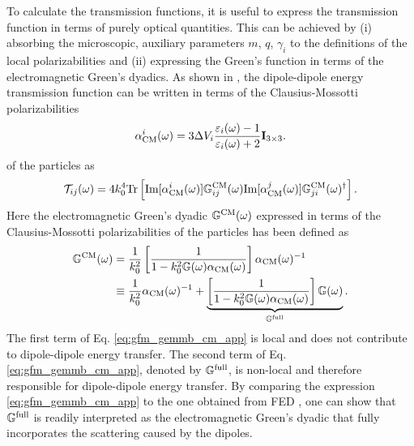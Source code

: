 To calculate the transmission functions, it is useful to express the transmission function in terms of purely optical quantities. This can be achieved by (i) absorbing the microscopic, auxiliary parameters $m$, $q$, $\gamma_i$ to the definitions of the local polarizabilities and (ii) expressing the Green's function in terms of the electromagnetic Green's dyadics. As shown in , the dipole-dipole energy transmission function can be written in terms of the Clausius-Mossotti polarizabilities
\begin{equation}
\alpha_{\textrm{CM}}^i(\omega) = 3\Delta V_i \frac{\varepsilon_i(\omega)-1}{\varepsilon_i(\omega)+2} \mathbf{I}_{3 \times 3}. \label{eq:gfm_alphacm_epsilon}
\end{equation}
of the particles as
\begin{equation}
   \mathcal{T}_{ij}(\omega) = 4 k_0^4 \textrm{Tr} \left[ \textrm{Im}[\alpha^i_{\textrm{CM}}(\omega)] {\mathbb{G}}^{\textrm{CM}}_{ij}(\omega) \textrm{Im}[\alpha^j_{\textrm{CM}}(\omega)] {\mathbb{G}}^{\textrm{CM}}_{ji}(\omega)^{\dagger}\right]. \label{eq:tij_final}
\end{equation}
Here the electromagnetic Green's dyadic ${\mathbb{G}}^{\textrm{CM}}(\omega)$ expressed in terms of the Clausius-Mossotti polarizabilities of the particles has been defined as 
\begin{alignat}{2}
 {\mathbb{G}}^{\textrm{CM}}(\omega) &= \frac{1}{k_0^2} \left[\frac{1}{1-k_0^2 \mathbb{G}(\omega)\alpha_{\textrm{CM}}(\omega)}\right] \alpha_{\textrm{CM}}(\omega)^{-1} \\
  &\equiv \frac{1}{k_0^2} \alpha_{\textrm{CM}}(\omega)^{-1} + \underbrace{ \left[\frac{1}{1-k_0^2 \mathbb{G}(\omega)\alpha_{\textrm{CM}}(\omega)} \right] \mathbb{G}(\omega)}_{{\mathbb{G}}^{\textrm{full}}}. \label{eq:gfm_gemmb_cm_app}
\end{alignat}
The first term of Eq. \eqref{eq:gfm_gemmb_cm_app} is local and does not contribute to dipole-dipole energy transfer. The second term of Eq. \eqref{eq:gfm_gemmb_cm_app}, denoted by ${\mathbb{G}}^{\textrm{full}}$, is non-local and therefore responsible for dipole-dipole energy transfer. By comparing the expression \eqref{eq:gfm_gemmb_cm_app} to the one obtained from FED \cite{benabdallah11}, one can show that ${\mathbb{G}}^{\textrm{full}}$ is readily interpreted as the electromagnetic Green's dyadic that fully incorporates the scattering caused by the dipoles.

\fi


